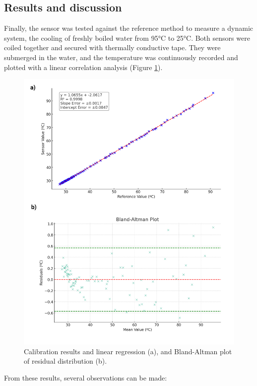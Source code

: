 \documentclass[conference]{IEEEtran}
\begin{document}
      \subsection{Results and discussion}

   Finally, the sensor was tested against the reference method to measure a dynamic system, the cooling of freshly boiled water from 95°C to 25°C. Both sensors were coiled together and secured with thermally conductive tape. 
   They were submerged in the water, and the temperature was continuously recorded and plotted with a linear correlation analysis (Figure \ref{fig:final}).

   \begin{figure}[h]
      \centering
      \includegraphics[width=\linewidth]{images/final results.png}
      \caption{Calibration results and linear regression (a), and Bland-Altman plot of residual distribution (b).}
      \label{fig:final}
      \end{figure}
      
      From these results, several observations can be made:
      
\end{document}
